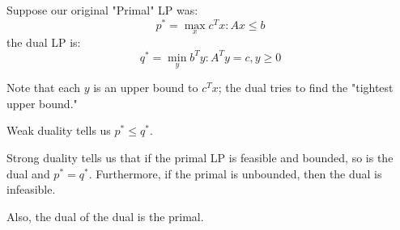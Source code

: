 \begin{definition} [Duality]
    Suppose our original "Primal" LP was:
    \[ p^* = \max_{x} c^T x : Ax \leq b \]
    the dual LP is:
    \[ q^* = \min_{y} b^T y : A^Ty = c, y \geq 0 \]
\end{definition}

Note that each $y$ is an upper bound to $c^T x$;
the dual tries to find the "tightest upper bound."

\begin{theorem}
    Weak duality tells us $p^* \leq q^*$.

    Strong duality tells us that if the primal LP is feasible and bounded, so is the dual and
    $p^* = q^*$. Furthermore, if the primal is unbounded, then the dual is infeasible.
\end{theorem}

Also, the dual of the dual is the primal.